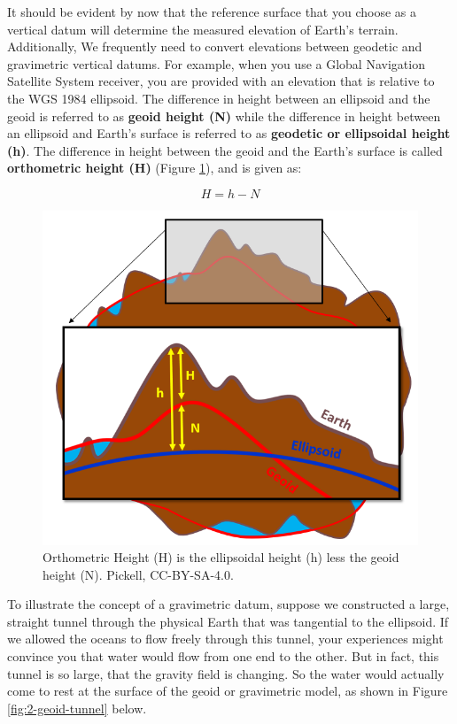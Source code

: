 \documentclass[
]{book}
\begin{document}
It should be evident by now that the reference surface that you choose as a vertical datum will determine the measured elevation of Earth's terrain. Additionally, We frequently need to convert elevations between geodetic and gravimetric vertical datums. For example, when you use a Global Navigation Satellite System receiver, you are provided with an elevation that is relative to the WGS 1984 ellipsoid. The difference in height between an ellipsoid and the geoid is referred to as \textbf{geoid height (N)} while the difference in height between an ellipsoid and Earth's surface is referred to as \textbf{geodetic or ellipsoidal height (h)}. The difference in height between the geoid and the Earth's surface is called \textbf{orthometric height (H)} (Figure \ref{fig:2-H-h-N}), and is given as:

\[
H = h - N
\]

\begin{figure}
\includegraphics[width=0.75\linewidth]{images/02-H-h-N} \caption{Orthometric Height (H) is the ellipsoidal height (h) less the geoid height (N). Pickell, CC-BY-SA-4.0.}\label{fig:2-H-h-N}
\end{figure}

To illustrate the concept of a gravimetric datum, suppose we constructed a large, straight tunnel through the physical Earth that was tangential to the ellipsoid. If we allowed the oceans to flow freely through this tunnel, your experiences might convince you that water would flow from one end to the other. But in fact, this tunnel is so large, that the gravity field is changing. So the water would actually come to rest at the surface of the geoid or gravimetric model, as shown in Figure \ref{fig:2-geoid-tunnel} below.
\end{document}
